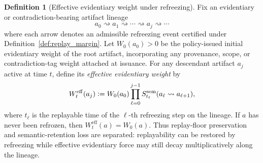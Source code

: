 \documentclass[11pt]{article}
\theoremstyle{definition}
\newtheorem{definition}[theorem]{Definition}
\newcommand{\1}{\mathbf{1}}
\newcommand{\Defeq}{\vcentcolon=}
\begin{document}
\begin{definition}[Effective evidentiary weight under refreezing]\label{def:effective_weight}
Fix an evidentiary or contradiction-bearing artifact lineage
\[
a_0\rightsquigarrow a_1\rightsquigarrow \cdots \rightsquigarrow a_j\rightsquigarrow \cdots
\]
where each arrow denotes an admissible refreezing event certified under Definition~\ref{def:replay_margin}. Let $W_0(a_0)>0$ be the policy-issued initial evidentiary weight of the root artifact, incorporating any provenance, scope, or contradiction-tag weight attached at issuance. For any descendant artifact $a_j$ active at time $t$, define its \emph{effective evidentiary weight} by
\[
W_t^{\mathrm{eff}}(a_j)\Defeq W_0(a_0)\prod_{\ell=0}^{j-1} S_{t_\ell}^{\mathrm{sem}}(a_\ell\rightsquigarrow a_{\ell+1}),
\]
where $t_\ell$ is the replayable time of the $\ell$-th refreezing step on the lineage. If $a$ has never been refrozen, then $W_t^{\mathrm{eff}}(a)=W_0(a)$. Thus replay-floor preservation and semantic-retention loss are separated: replayability can be restored by refreezing while effective evidentiary force may still decay multiplicatively along the lineage.
\end{definition}
\end{document}
